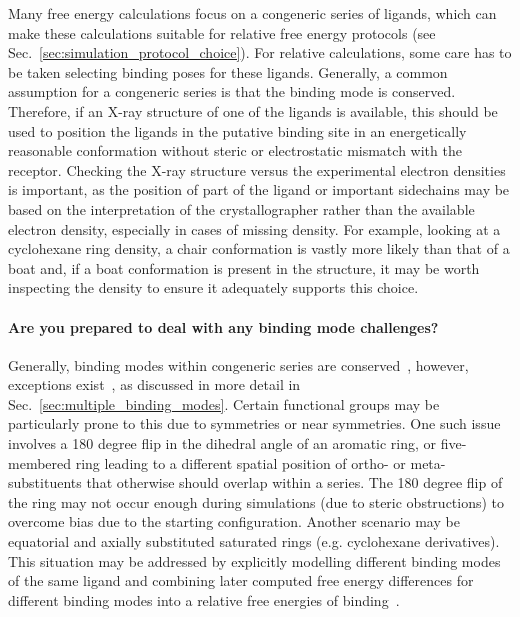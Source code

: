 \documentclass[9pt,bestpractices]{livecoms}
\begin{document}
Many free energy calculations focus on a congeneric series of ligands, which can make these calculations suitable for relative free energy protocols (see Sec.~\ref{sec:simulation_protocol_choice}). For relative calculations, some care has to be taken selecting binding poses for these ligands. Generally, a common assumption for a congeneric series is that the binding mode is conserved. Therefore, if an X-ray structure of one of the ligands is available, this should be used to position the ligands in the putative binding site in an energetically reasonable conformation without steric or electrostatic mismatch with the receptor. Checking the X-ray structure versus the experimental electron densities is important, as the position of part of the ligand or important sidechains may be based on the interpretation of the crystallographer rather than the available electron density, especially in cases of missing density. For example, looking at a cyclohexane ring density, a chair conformation is vastly more likely than that of a boat and, if a boat conformation is present in the structure, it may be worth inspecting the density to ensure it adequately supports this choice. 

\paragraph{Are you prepared to deal with any binding mode challenges?}
Generally, binding modes within congeneric series are conserved~\cite{wacker2010conserved}, however, exceptions exist~\cite{brandt2011congeneric,nazare2005probing}, as discussed in more detail in Sec.~\ref{sec:multiple_binding_modes}. Certain functional groups may be particularly prone to this due to symmetries or near symmetries. One such issue involves a 180 degree flip in the dihedral angle of an aromatic ring, or five-membered ring leading to a different spatial position of ortho- or meta- substituents that otherwise should overlap within a series. The 180 degree flip of the ring may not occur enough during simulations (due to steric obstructions) to overcome bias due to the starting configuration. Another scenario may be equatorial and axially substituted saturated rings (e.g. cyclohexane derivatives). This situation may be addressed by explicitly modelling different binding modes of the same ligand and combining later computed free energy differences for different binding modes into a relative free energies of binding~\cite{kaus2015how}.
\end{document}
